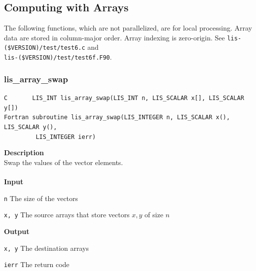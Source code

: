 \documentclass[a4paper]{article}
\newcommand{\namelistlabel}[1]{\mbox{#1}\hfill}
\newenvironment{namelist}[1]{%
\begin{list}{}
  {\let\makelabel\namelistlabel
  \settowidth{\labelwidth}{#1}
  \setlength{\leftmargin}{1.1\labelwidth}}
  }{%
\end{list}}
\begin{document}
\newpage
\subsection{Computing with Arrays}
The following functions, which are not parallelized, are for local processing.
Array data are stored in column-major order. Array indexing is zero-origin.
See {\tt lis-(\$VERSION)/test/test6.c} and \\
{\tt lis-(\$VERSION)/test/test6f.F90}. 

\subsubsection{lis\_array\_swap}
\begin{screen}
\verb|C       LIS_INT lis_array_swap(LIS_INT n, LIS_SCALAR x[], LIS_SCALAR y[])|\\
\verb|Fortran subroutine lis_array_swap(LIS_INTEGER n, LIS_SCALAR x(), LIS_SCALAR y(),|\\
\verb|         LIS_INTEGER ierr)|
\end{screen}
{\bf Description}\\
\indent
Swap the values of the vector elements.
\\ \\
\noindent
{\bf Input}
\begin{namelist}{XXXXXXXXXXXXXXXXXXXX}
\item[\tt n] The size of the vectors
\item[\tt x, y] The source arrays that store vectors $x, y$ of size $n$
\end{namelist}
{\bf Output}
\begin{namelist}{XXXXXXXXXXXXXXXXXXXX}
\item[\tt x, y] The destination arrays
\item[\tt ierr] The return code
\end{namelist}
\end{document}
